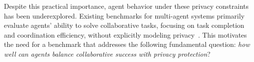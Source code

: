 Despite this practical importance, agent behavior under these privacy constraints has been underexplored.
Existing benchmarks for multi-agent systems primarily evaluate agents' ability to solve collaborative tasks, focusing on task completion and coordination efficiency, without explicitly modeling privacy~\citep{battleagentbench, gemmas, realmbench}.
This motivates the need for a benchmark that addresses the following fundamental question: \textit{how well can agents balance collaborative success with privacy protection}?


